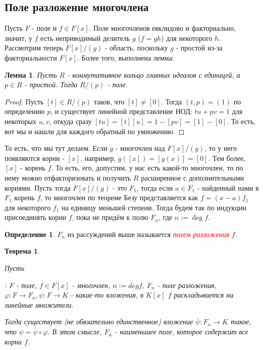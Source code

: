 \documentclass[a4paper,100pt]{article}
\theoremstyle{indented}
\newtheorem{theorem}{Теорема}
\newtheorem{lemma}{Лемма}
\theoremstyle{definition}
\newtheorem{defn}{Определение}
\theoremstyle{remark}
\begin{document}
\resetall

\subsection{Поле разложение многочлена}

Пусть $F$ - поле и $f\in F[x]$. Поле многочленов евклидово и факториально, значит, у $f$ есть неприводимый делитель $g$ ($f=gh$) для некоторого $h$. Рассмотрим теперь  $F[x]/(g)$ - область, поскольку $g$ - простой из-за факториальности $F[x]$. Более того, выполнена лемма:\\

\begin{lemma}
    Пусть $R$ - коммутативное кольцо главных идеалов с единицей, а $p\in R$ - простой. Тогда $R/(p)$ - поле. 
\end{lemma}

\begin{proof}
    Пусть $[t]\in R/(p)$ таков, что $[t]\neq [0]$. Тогда $(t, p)=(1)$ по определению $p$, и существует линейной представление НОД: $tu+pv=1$ для некоторых $u, v$, откуда сразу $[tu]=[t][u]=1-[pv]=[1]-[0]$. То есть, вот мы и нашли для каждого обратный по умножению.
\end{proof}

То есть, что мы тут делаем. Если $g$ - многочлен над $F[x]/(g)$, то у него появляются корни - $[x]$, например, $g([x])=[g(x)]=[0]$. Тем более, $[x]$ - корень $f$. То есть, его, допустим, у нас есть какой-то многочлен, то по нему можно отфакторизовать и получить $R$ расширенное с дополнительными корнями. Пусть тогда $F[x]/(g)$ - это $F_1$, тогда если $a\in F_1$ - найденный нами в $F_1$ корень $f$, то многочлен по теореме Безу представляется как $f=(x-a)f_1$ для некоторого $f_1$ на единицу меньшей степени. Тогда будем так по индукции присоединять корни $f$, пока не придём к полю $F_n$, где $n:=\deg f$.

\begin{defn}
    $F_n$ из рассуждений выше называется \hypertarget{n37}{\textcolor{red}{\textit{полем разложения}}} $f$.
\end{defn}

\begin{theorem}
    \hypertarget{t6}{Пусть}: $F$ - поле, $f\in F[x]$ - многочлен, $n:=deg f$, $F_n$ - поле разложения, $\varphi: F\rightarrow F_n, \psi : F\rightarrow K$ - какие-то вложения, в $K[x]$ $f$ раскладывается на линейные множители.\ 

    Тогда существует (не обязательно единственное) вложение $\bar{\psi}:F_n\rightarrow K$ такое, что $\psi=\bar{\psi}\circ \varphi$. В этом смысле, $F_n$ - наименьшее поле, которое содержит все корни $f$.
\end{theorem}
\end{document}
